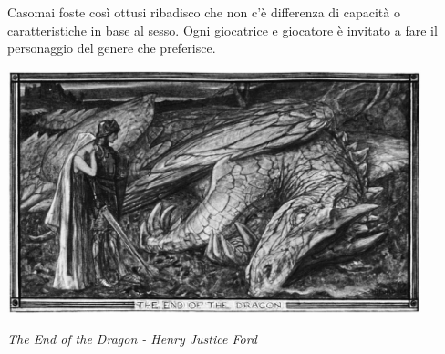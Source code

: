 \begin{changemargin}{0.3cm}{0.3cm}\begin{tcolorbox}[title = Nota sul Sesso del personaggi]
Casomai foste così ottusi ribadisco che non c'è differenza di capacità o caratteristiche in base al sesso. Ogni giocatrice e giocatore è invitato a fare il personaggio del genere che preferisce.
\end{tcolorbox}\end{changemargin}

\vfill

\begin{center}
\includegraphics[keepaspectratio,width=0.9\textwidth]{immagini/Dragon_by_Henry_Justice_Ford_grey.png}

\emph{The End of the Dragon - Henry Justice Ford}
\end{center}

\pagebreak

